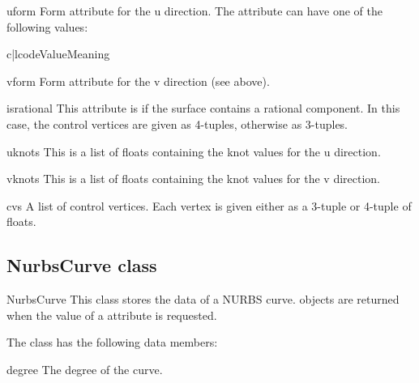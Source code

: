 \begin{memberdesc}{uform}
Form attribute for the u direction. The attribute can have one of the 
following values:

\begin{tableii}{c|l}{code}{Value}{Meaning}
\end{tableii}
\end{memberdesc}

\begin{memberdesc}{vform}
Form attribute for the v direction (see above).
\end{memberdesc}

\begin{memberdesc}{isrational}
This attribute is  if the surface contains a rational component.
In this case, the control vertices are given as 4-tuples, otherwise
as 3-tuples. 
\end{memberdesc}

\begin{memberdesc}{uknots}
This is a list of floats containing the knot values for the u direction.
\end{memberdesc}

\begin{memberdesc}{vknots}
This is a list of floats containing the knot values for the v direction.
\end{memberdesc}

\begin{memberdesc}{cvs}
A list of control vertices. Each vertex is given either as a 3-tuple or
4-tuple of floats.
\end{memberdesc}

\subsection{NurbsCurve class}
\label{nurbscurve}

\begin{classdesc*}{NurbsCurve}
This class stores the data of a NURBS curve.  objects
are returned when the value of a  attribute is requested.
\end{classdesc*}

The class has the following data members:

\begin{memberdesc}{degree}
The degree of the curve.
\end{memberdesc}

